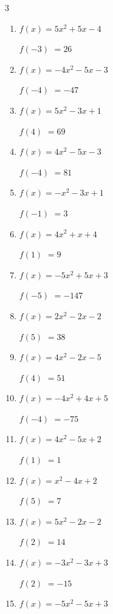 \begin{multicols}{3}
\begin{enumerate}
$f(-1)$
        $= -4$

\columnbreak %

  \item $f(x)=5x^{2}+5x-4$

$f(-3)$
        $= 26$

  \item $f(x)=-4x^{2}-5x-3$

$f(-4)$
        $= -47$

  \item $f(x)=5x^{2}-3x+1$

$f(4)$
        $= 69$

  \item $f(x)=4x^{2}-5x-3$

$f(-4)$
        $= 81$

  \item $f(x)=-x^{2}-3x+1$

$f(-1)$
        $= 3$

  \item $f(x)=4x^{2}+x+4$

$f(1)$
        $= 9$

  \item $f(x)=-5x^{2}+5x+3$

$f(-5)$
        $= -147$

  \item $f(x)=2x^{2}-2x-2$

$f(5)$
        $= 38$

  \item $f(x)=4x^{2}-2x-5$

$f(4)$
        $= 51$

  \item $f(x)=-4x^{2}+4x+5$

$f(-4)$
        $= -75$

  \item $f(x)=4x^{2}-5x+2$

$f(1)$
        $= 1$

  \item $f(x)=x^{2}-4x+2$

$f(5)$
        $= 7$

  \item $f(x)=5x^{2}-2x-2$

$f(2)$
        $= 14$

  \item $f(x)=-3x^{2}-3x+3$

$f(2)$
        $= -15$

  \item $f(x)=-5x^{2}-5x+3$


\end{enumerate}
\end{multicols}
